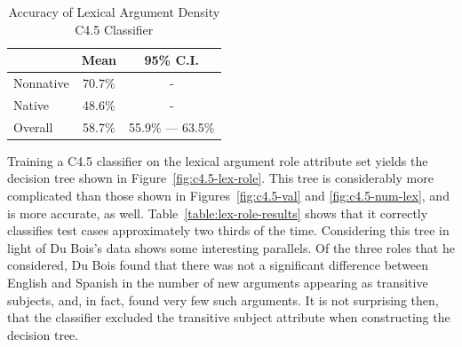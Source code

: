 \documentclass[main.tex]{subfiles}
\begin{document}
\begin{table}[ht]
\centering
\caption{Accuracy of Lexical Argument Density C4.5 Classifier}
\begin{tabular}{l c c}
\toprule
& Mean & 95\% C.I.\\
\midrule
Nonnative & 70.7\% & - \\
Native & 48.6\% & - \\
Overall & 58.7\% & 55.9\% --- 63.5\% \\
\bottomrule
\end{tabular}
\label{table:num-lex-results}
\end{table}

Training a C4.5 classifier on the lexical argument role attribute set yields the decision tree shown in Figure~\ref{fig:c4.5-lex-role}. This tree is considerably more complicated than those shown in Figures~\ref{fig:c4.5-val} and \ref{fig:c4.5-num-lex}, and is more accurate, as well. Table~\ref{table:lex-role-results} shows that it correctly classifies test cases approximately two thirds of the time. Considering this tree in light of Du Bois's data shows some interesting parallels. Of the three roles that he considered, Du Bois found that there was not a significant difference between English and Spanish in the number of new arguments appearing as transitive subjects, and, in fact, found very few such arguments. It is not surprising then, that the classifier excluded the transitive subject attribute when constructing the decision tree.
\end{document}
